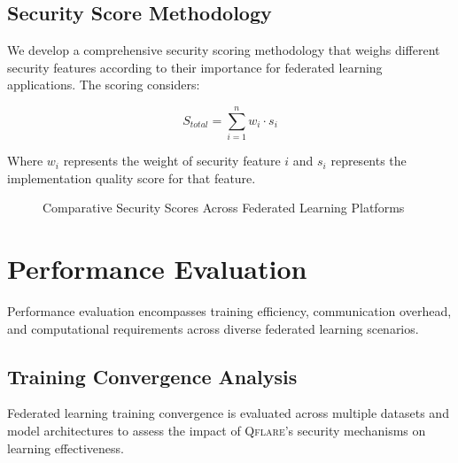 ﻿\documentclass[12pt,a4paper,twoside]{book}
\newcommand{\qflare}{\textsc{Qflare}}
\begin{document}
\subsection{Security Score Methodology}
\label{subsec:security-score}

We develop a comprehensive security scoring methodology that weighs different security features according to their importance for federated learning applications. The scoring considers:

\begin{equation}
\label{eq:security-score}
S_{total} = \sum_{i=1}^{n} w_i \cdot s_i
\end{equation}

Where $w_i$ represents the weight of security feature $i$ and $s_i$ represents the implementation quality score for that feature.

\begin{figure}[htbp]
\centering
{}
\caption{Comparative Security Scores Across Federated Learning Platforms}
\label{fig:security-scores}
\end{figure}

\section{Performance Evaluation}
\label{sec:performance-evaluation}

Performance evaluation encompasses training efficiency, communication overhead, and computational requirements across diverse federated learning scenarios.

\subsection{Training Convergence Analysis}
\label{subsec:convergence-analysis}

Federated learning training convergence is evaluated across multiple datasets and model architectures to assess the impact of \qflare{}'s security mechanisms on learning effectiveness.
\end{document}
